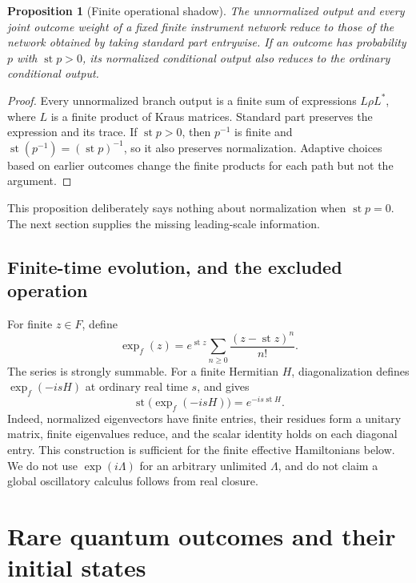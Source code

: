 \documentclass[11pt,oneside]{article}
\numberwithin{equation}{section}
\theoremstyle{plain}
\newtheorem{proposition}[theorem]{Proposition}
\theoremstyle{definition}
\theoremstyle{remark}
\newcommand{\st}{\operatorname{st}}
\begin{document}
\begin{proposition}[Finite operational shadow]\label{prop:shadow}
The unnormalized output and every joint outcome weight of a fixed finite instrument network reduce to those of the network obtained by taking standard part entrywise. If an outcome has probability $p$ with $\st p>0$, its normalized conditional output also reduces to the ordinary conditional output.
\end{proposition}
\begin{proof}
Every unnormalized branch output is a finite sum of expressions $L\rho L^*$, where $L$ is a finite product of Kraus matrices. Standard part preserves the expression and its trace. If $\st p>0$, then $p^{-1}$ is finite and $\st(p^{-1})=(\st p)^{-1}$, so it also preserves normalization. Adaptive choices based on earlier outcomes change the finite products for each path but not the argument.
\end{proof}

This proposition deliberately says nothing about normalization when $\st p=0$. The next section supplies the missing leading-scale information.

\subsection{Finite-time evolution, and the excluded operation}
For finite $z\in F$, define
\begin{equation}
 \exp_f(z)=e^{\st z}\sum_{n\ge0}\frac{(z-\st z)^n}{n!}.
\end{equation}
The series is strongly summable. For a finite Hermitian $H$, diagonalization defines $\exp_f(-isH)$ at ordinary real time $s$, and gives
\begin{equation}\label{eq:exp-shadow}
 \st\bigl(\exp_f(-isH)\bigr)=e^{-is\st H}.
\end{equation}
Indeed, normalized eigenvectors have finite entries, their residues form a unitary matrix, finite eigenvalues reduce, and the scalar identity holds on each diagonal entry. This construction is sufficient for the finite effective Hamiltonians below. We do not use $\exp(i\Lambda)$ for an arbitrary unlimited $\Lambda$, and do not claim a global oscillatory calculus follows from real closure.

\section{Rare quantum outcomes and their initial states}\label{sec:rare}
\end{document}
